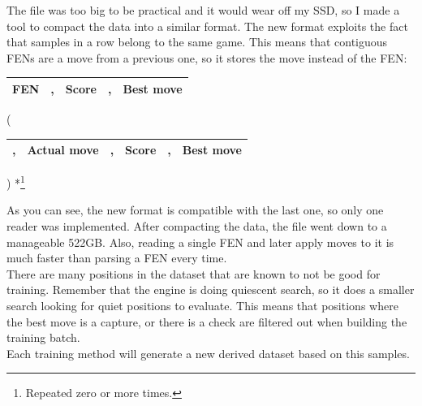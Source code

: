 
The file was too big to be practical and it would wear off my SSD, so I made a tool to compact the data into a similar format. The new format exploits the fact that samples in a row belong to the same game. This means that contiguous FENs are a move from a previous one, so it stores the move instead of the FEN:

\begin{center}
\begin{tabular}{|cp{0.0005cm}cp{0.0005cm}c|}
\hline
\textbf{FEN} & , & \textbf{Score} & , & \textbf{Best move} \\
\hline
\end{tabular}
(
\begin{tabular}{|p{0.0005cm}cp{0.0005cm}cp{0.0005cm}c|}
\hline
, & \textbf{Actual move} & , & \textbf{Score} & , & \textbf{Best move} \\
\hline
\end{tabular}
) *\footnote{Repeated zero or more times.}
\end{center}

As you can see, the new format is compatible with the last one, so only one reader was implemented. After compacting the data, the file went down to a manageable 522GB. Also, reading a single FEN and later apply moves to it is much faster than parsing a FEN every time. \\

There are many positions in the dataset that are known to not be good for training. Remember that the engine is doing quiescent search, so it does a smaller search looking for quiet positions to evaluate. This means that positions where the best move is a capture, or there is a check are filtered out when building the training batch. \\

Each training method will generate a new derived dataset based on this samples.


